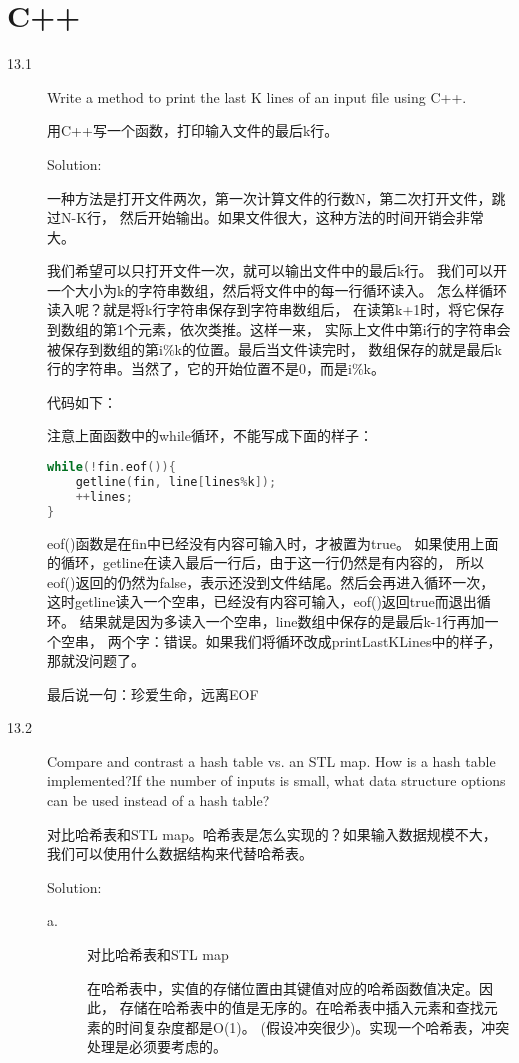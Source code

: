 \chapter{C++}

\begin{description}
\item[13.1] Write a method to print the last K lines of an input file using C++.

用C++写一个函数，打印输入文件的最后k行。

Solution: 

一种方法是打开文件两次，第一次计算文件的行数N，第二次打开文件，跳过N-K行， 然后开始输出。如果文件很大，这种方法的时间开销会非常大。

我们希望可以只打开文件一次，就可以输出文件中的最后k行。 我们可以开一个大小为k的字符串数组，然后将文件中的每一行循环读入。 怎么样循环读入呢？就是将k行字符串保存到字符串数组后， 在读第k+1时，将它保存到数组的第1个元素，依次类推。这样一来， 实际上文件中第i行的字符串会被保存到数组的第i\%k的位置。最后当文件读完时， 数组保存的就是最后k行的字符串。当然了，它的开始位置不是0，而是i\%k。

代码如下：

注意上面函数中的while循环，不能写成下面的样子：
\begin{lstlisting}[language=C++]
while(!fin.eof()){
    getline(fin, line[lines%k]);
    ++lines;
}
\end{lstlisting}
eof()函数是在fin中已经没有内容可输入时，才被置为true。 如果使用上面的循环，getline在读入最后一行后，由于这一行仍然是有内容的， 所以eof()返回的仍然为false，表示还没到文件结尾。然后会再进入循环一次， 这时getline读入一个空串，已经没有内容可输入，eof()返回true而退出循环。 结果就是因为多读入一个空串，line数组中保存的是最后k-1行再加一个空串， 两个字：错误。如果我们将循环改成printLastKLines中的样子，那就没问题了。

最后说一句：珍爱生命，远离EOF


\item[13.2] Compare and contrast a hash table vs. an STL map. How is a hash table implemented?If the number of inputs is small, what data structure options can be used instead of a hash table?

对比哈希表和STL map。哈希表是怎么实现的？如果输入数据规模不大， 我们可以使用什么数据结构来代替哈希表。

Solution: 
\begin{description}
\item[a.] 对比哈希表和STL map

  在哈希表中，实值的存储位置由其键值对应的哈希函数值决定。因此， 存储在哈希表中的值是无序的。在哈希表中插入元素和查找元素的时间复杂度都是O(1)。 (假设冲突很少)。实现一个哈希表，冲突处理是必须要考虑的。


\end{description}
\end{description}
